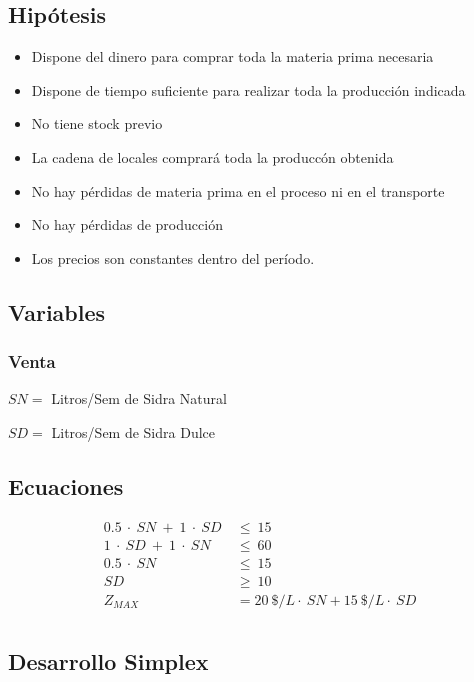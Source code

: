 \documentclass[a4paper,10pt]{article}
\begin{document}
\subsection{Hip\'otesis}
\begin{itemize}
  \item{Dispone del dinero para comprar toda la materia prima necesaria}
 \item{Dispone de tiempo suficiente para realizar toda la producci\'on indicada}
 \item{No tiene stock previo}
 \item{La cadena de locales comprar\'a toda la producc\'on obtenida}
 \item{No hay p\'erdidas de materia prima en el proceso ni en el transporte}
 \item{No hay p\'erdidas de producci\'on}
 \item{Los precios son constantes dentro del per\'iodo.}
\end{itemize}
 
\subsection{Variables}

 \subsubsection{Venta}
\vspace{2mm}
 $ SN = $ Litros/Sem de Sidra Natural
 
 $ SD = $ Litros/Sem de Sidra Dulce
 \vspace{2mm}
 
\subsection{Ecuaciones}

\begin{align*}
0.5\ \cdot \ SN\ + \ 1\ \cdot \ SD \ &\leq \ 15  \\
1\ \cdot \  SD\ +\ 1\ \cdot \ SN \ &\leq \ 60  \\
 0.5\ \cdot \ SN\ &\leq \ 15  \\
 SD \ &\geq\ 10  \\
 Z_{MAX} &= 20 \ \$/L \cdot \ SN + 15 \ \$/L \cdot \ SD \\
\end{align*}

\subsection{Desarrollo Simplex}
\end{document}
